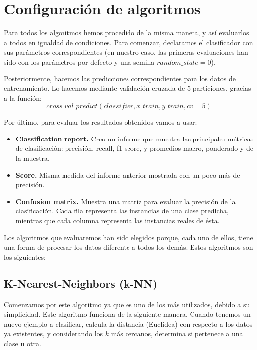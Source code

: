 \documentclass[11pt,a4paper]{article}
\begin{document}



\section{Configuración de algoritmos}
Para todos los algoritmos hemos procedido de la misma manera, y así evaluarlos a todos en igualdad de condiciones. Para comenzar,
declaramos el clasificador con sus parámetros correspondientes (en nuestro caso, las primeras evaluaciones han sido con los
parámetros por defecto y una semilla $random\_state=0$).

Posteriormente, hacemos las predicciones correspondientes para los datos de entrenamiento. Lo hacemos mediante validación cruzada
de 5 particiones, gracias a la función:
$$cross\_val\_predict(classifier, x\_train, y\_train, cv=5)$$

Por último, para evaluar los resultados obtenidos vamos a usar:
\begin{itemize}
    \item \textbf{Classification report.} Crea un informe que muestra las principales métricas de clasificación: precisión, recall,
          f1-score, y promedios macro, ponderado y de la muestra.
    \item \textbf{Score.} Misma medida del informe anterior mostrada con un poco más de precisión.
    \item \textbf{Confusion matrix.} Muestra una matriz para evaluar la precisión de la clasificación. Cada fila representa las
          instancias de una clase predicha, mientras que cada columna representa las instancias reales de ésta.
\end{itemize}

Los algoritmos que evaluaremos han sido elegidos porque, cada uno de ellos, tiene una forma de procesar los datos diferente a todos
los demás. Estos algoritmos son los siguientes:


\subsection{K-Nearest-Neighbors (k-NN)}
Comenzamos por este algoritmo ya que es uno de los más utilizados, debido a su simplicidad. Este algoritmo funciona de la siguiente
manera. Cuando tenemos un nuevo ejemplo a clasificar, calcula la distancia (Euclídea) con respecto a los datos ya existentes, y
considerando los $k$ más cercanos, determina si pertenece a una clase u otra.
\end{document}
